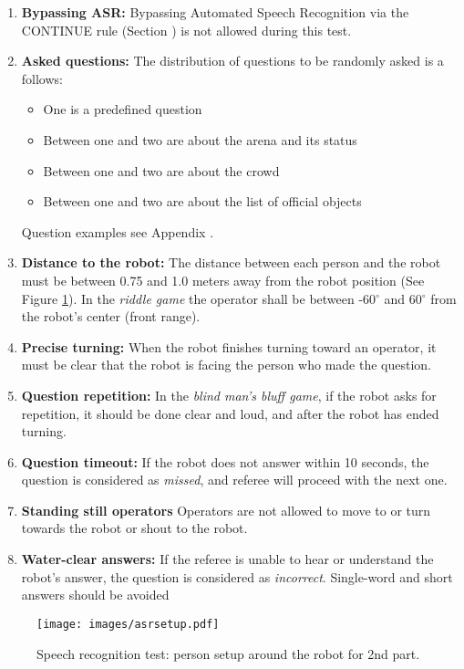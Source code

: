 \begin{enumerate}
    \item \textbf{Bypassing ASR:} Bypassing Automated Speech Recognition via the CONTINUE rule (Section ) is not allowed during this test.
    \item \textbf{Asked questions:} The distribution of questions to be randomly asked is a follows:
    \begin{itemize}
        \item One is a predefined question
        \item Between one and two are about the arena and its status
        \item Between one and two are about the crowd
        \item Between one and two are about the list of official objects
    \end{itemize}
    Question examples see Appendix .
    \item \textbf{Distance to the robot:} The distance between each person and the robot must be between 0.75 and 1.0 meters away from the robot position (See Figure \ref{fig:asrsetup}). In the \textit{riddle game} the operator shall be between -60$^{\circ}$ and 60$^{\circ}$ from the robot's center (front range).
    \item \textbf{Precise turning:} When the robot finishes turning toward an operator, it must be clear that the robot is facing the person who made the question.
    \item \textbf{Question repetition:} In the \textit{blind man's bluff game}, if the robot asks for repetition, it should be done clear and loud, and after the robot has ended turning.
    \item \textbf{Question timeout:} If the robot does not answer within 10 seconds, the question is considered as \textit{missed}, and referee will proceed with the next one.
    \item \textbf{Standing still operators} Operators are not allowed to move to or turn towards the robot or shout to the robot.
    \item \textbf{Water-clear answers:} If the referee is unable to hear or understand the robot's answer, the question is considered as \textit{incorrect}. Single-word and short answers should be avoided
\end{enumerate}

\begin{figure}[!h]
	\centering
	\texttt{[image: images/asrsetup.pdf]}
	\caption{Speech recognition test: person setup around the robot for 2nd part.}
	\label{fig:asrsetup}
\end{figure}

